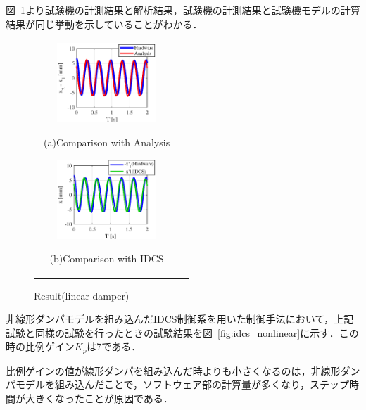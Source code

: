 \documentclass{article_vdlab_sotsuron_youshi}
\begin{document}
図~\ref{fig:idcs_linear}より試験機の計測結果と解析結果，試験機の計測結果と試験機モデルの計算結果が同じ挙動を示していることがわかる．

\vspace*{2mm}
\begin{figure}[h]
  \begin{tabular}{cc}
  \begin{minipage}{0.5\hsize}
  \begin{center}
    \includegraphics[height=30mm]{figure/sus_linear_5_3.eps}
    \end{center}
    \begin{center}
      \vspace{-3mm}
    \ (a)Comparison with Analysis\
    \end{center}
  \end{minipage}
  \begin{minipage}{0.5\hsize}
     \begin{center}
      \includegraphics[height=30mm]{figure/idcs_linear_5_3.eps}
      \end{center}
      \begin{center}
        \vspace{-3mm}
      \ (b)Comparison with IDCS\
    \end{center}
  \end{minipage}
  \end{tabular}
  \caption{Result(linear damper)}
    \label{fig:idcs_linear}
\end{figure}

非線形ダンパモデルを組み込んだIDCS制御系を用いた制御手法において，上記試験と同様の試験を行ったときの試験結果を図~\ref{fig:idcs_nonlinear}に示す．この時の比例ゲイン$K_p$は7である．

比例ゲインの値が線形ダンパを組み込んだ時よりも小さくなるのは，非線形ダンパモデルを組み込んだことで，ソフトウェア部の計算量が多くなり，ステップ時間が大きくなったことが原因である．
\end{document}
